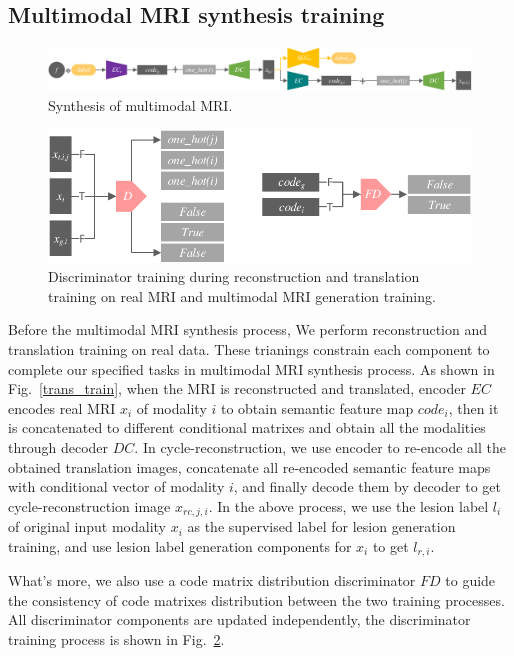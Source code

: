\documentclass{ecai}
\begin{document}
\subsection{Multimodal MRI synthesis training}
\begin{figure}
	\centering
	\includegraphics[width=1.98\columnwidth]{figures/mm_mri_generate}
	\caption{Synthesis of multimodal MRI.}
	\label{mm_mri_generate}
\end{figure}

\begin{figure}
	\centering
	\includegraphics[width=0.95\columnwidth]{figures/D}
	\caption{Discriminator training during reconstruction and translation training on real MRI and multimodal MRI generation training.}
	\label{train_D}
\end{figure}
Before the multimodal MRI synthesis process, We perform reconstruction and translation training on real data. These trianings constrain each component to complete our specified tasks in multimodal MRI synthesis process. 
As shown in Fig.~\ref{trans_train}, when the MRI is reconstructed and translated, encoder $EC$ encodes real MRI $x_i$ of modality $i$ to obtain semantic feature map $code_{i}$, then it is concatenated to different conditional matrixes and obtain all the modalities through decoder $DC$. In cycle-reconstruction, we use encoder to re-encode all the obtained translation images, concatenate all re-encoded semantic feature maps with conditional vector of modality $i$, and finally decode them by decoder to get cycle-reconstruction image $x_{rc,j,i}$. In the above process, we use the lesion label $l_i$ of original input modality $x_i$ as the supervised label for lesion generation training, and use lesion label generation components for $x_i$ to get $l_{r,i}$. 

What's more, we also use a code matrix distribution discriminator $FD$ to guide the consistency of code matrixes distribution between the two training processes. All discriminator components are updated independently, the discriminator training process is shown in Fig.~\ref{train_D}.
\end{document}
